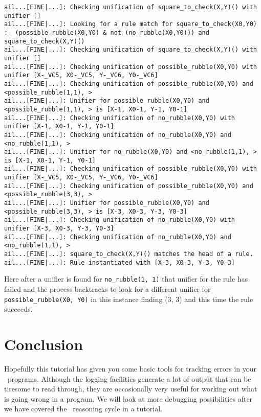 \begin{verbatim}
ail...[FINE|...]: Checking unification of square_to_check(X,Y)() with unifier [] 
ail...[FINE|...]: Looking for a rule match for square_to_check(X0,Y0) :- (possible_rubble(X0,Y0) & not (no_rubble(X0,Y0))) and square_to_check(X,Y)() 
ail...[FINE|...]: Checking unification of square_to_check(X,Y)() with unifier [] 
ail...[FINE|...]: Checking unification of possible_rubble(X0,Y0) with unifier [X-_VC5, X0-_VC5, Y-_VC6, Y0-_VC6] 
ail...[FINE|...]: Checking unification of possible_rubble(X0,Y0) and <possible_rubble(1,1), > 
ail...[FINE|...]: Unifier for possible_rubble(X0,Y0) and <possible_rubble(1,1), > is [X-1, X0-1, Y-1, Y0-1] 
ail...[FINE|...]: Checking unification of no_rubble(X0,Y0) with unifier [X-1, X0-1, Y-1, Y0-1] 
ail...[FINE|...]: Checking unification of no_rubble(X0,Y0) and <no_rubble(1,1), > 
ail...[FINE|...]: Unifier for no_rubble(X0,Y0) and <no_rubble(1,1), > is [X-1, X0-1, Y-1, Y0-1] 
ail...[FINE|...]: Checking unification of possible_rubble(X0,Y0) with unifier [X-_VC5, X0-_VC5, Y-_VC6, Y0-_VC6] 
ail...[FINE|...]: Checking unification of possible_rubble(X0,Y0) and <possible_rubble(3,3), > 
ail...[FINE|...]: Unifier for possible_rubble(X0,Y0) and <possible_rubble(3,3), > is [X-3, X0-3, Y-3, Y0-3] 
ail...[FINE|...]: Checking unification of no_rubble(X0,Y0) with unifier [X-3, X0-3, Y-3, Y0-3] 
ail...[FINE|...]: Checking unification of no_rubble(X0,Y0) and <no_rubble(1,1), > 
ail...[FINE|...]: square_to_check(X,Y)() matches the head of a rule. 
ail...[FINE|...]: Rule instantiated with [X-3, X0-3, Y-3, Y0-3] 
\end{verbatim}
Here after a unifier is found for \texttt{no\_rubble(1, 1)} that unifier for the rule has failed and the process backtracks to look for a different unifier for \texttt{possible\_rubble(X0, Y0)} in this instance finding (3, 3) and this time the rule succeeds.

\section{Conclusion}
Hopefully this tutorial has given you some basic tools for tracking errors in your \gwendolen\ programs.  Although the logging facilities generate a lot of output that can be tiresome to read through, they are occasionally very useful for working out what is going wrong in a program.  We will look at more debugging possibilities after we have covered the \gwendolen\ reasoning cycle in a tutorial.

